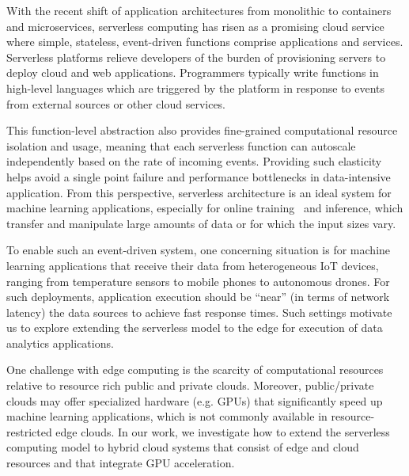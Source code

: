 With the recent shift of application architectures from monolithic to containers and microservices, serverless computing has risen as a promising cloud service where simple, stateless, 
event-driven functions comprise applications and services. 
Serverless platforms relieve
developers of the burden of provisioning servers to deploy 
cloud and web applications.
Programmers typically write functions in high-level languages which are triggered by the platform in response to events from external sources or other cloud services. 

This function-level abstraction also provides fine-grained computational resource isolation and usage, meaning that each serverless function can autoscale independently based on the rate of incoming events. Providing such elasticity helps avoid a single point failure and performance bottlenecks in data-intensive application. From this perspective, serverless architecture is an ideal system for machine learning applications, especially for online training~\cite{ref:online} and inference, which transfer and manipulate large amounts of data or for 
which the input sizes vary.

To enable such an event-driven system, one concerning situation is for machine learning applications that receive their data from  heterogeneous IoT devices, ranging from temperature sensors to mobile phones to autonomous drones. For such deployments, application execution should be ``near'' (in terms of network latency) the data sources to achieve fast response times. Such settings motivate us to explore extending the serverless model to the edge for execution of data analytics applications.

One challenge with edge computing is the scarcity of computational resources relative to resource rich public and private clouds.  Moreover, public/private clouds may offer specialized hardware (e.g. GPUs) that significantly speed up machine learning applications, which is not commonly available in resource-restricted edge clouds.
In our work, we investigate how to extend the serverless computing model to hybrid cloud systems that consist of edge and cloud resources and that integrate GPU acceleration. 

